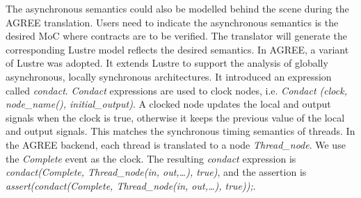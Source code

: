 The asynchronous semantics could also be modelled behind the scene during the AGREE translation. Users need to indicate the asynchronous semantics is the desired MoC where contracts are to be verified. The translator will generate the corresponding Lustre model reflects the desired semantics. In AGREE, a variant of Lustre \cite{GAO2008111} was adopted. It extends Lustre to support the analysis of globally asynchronous, locally synchronous architectures. It introduced an expression called \emph{condact}. \emph{Condact} expressions are used to clock nodes, i.e. \emph{Condact (clock, node\_name(), initial\_output)}. A clocked node updates the local and output signals when the clock is true, otherwise it keeps the previous value of the local and output signals. This matches the synchronous timing semantics of threads. In the AGREE backend, each thread is translated to a node \emph{Thread\_node}. We use the \emph{Complete} event as the clock. The resulting \emph{condact} expression is \emph{condact(Complete, Thread\_node(in, out,…), true)}, and the assertion is \emph{assert(condact(Complete, Thread\_node(in, out,…), true));}. 


